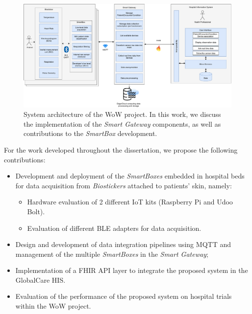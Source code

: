 \clearpage
\begin{figure}[H]
    \centering
    \includegraphics[width=\linewidth]{images/wow-system-architecture.pdf}
    \caption[System architecture of the \acs{WoW} project.]{System architecture of the \acs{WoW} project. In this work, we discuss the implementation of the \textit{Smart Gateway} components, as well as contributions to the \textit{SmartBox} development.}
    \label{fig:wow-architecture}
\end{figure}

For the work developed throughout the dissertation, we propose the following contributions:

\begin{itemize}
    \item Development and deployment of the \textit{SmartBoxes} embedded in hospital beds for data acquisition from \textit{Biostickers} attached to patients’ skin, namely:
    \begin{itemize}
        \item Hardware evaluation of 2 different \acs{IoT} kits (Raspberry Pi and Udoo Bolt).
        \item Evaluation of different \acs{BLE} adapters for data acquisition.
    \end{itemize}
    \item Design and development of data integration pipelines using \acs{MQTT} and management of the multiple \textit{SmartBoxes} in the \textit{Smart Gateway};
    \item Implementation of a \acs{FHIR} \acs{API} layer to integrate the proposed system in the GlobalCare \acs{HIS}.
    \item Evaluation of the performance of the proposed system on hospital trials within the \acs{WoW} project.
\end{itemize}

